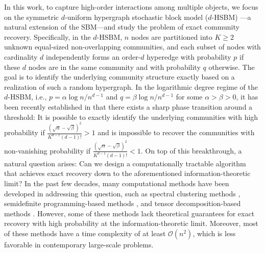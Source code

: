 \documentclass{article}
\theoremstyle{plain}
\theoremstyle{definition}
\theoremstyle{remark}
\newcommand{\OCal}{\mathcal{O}}
\begin{document}
In this work, to capture high-order interactions among multiple objects, we focus on the symmetric $d$-uniform hypergraph stochastic block model ($d$-HSBM) \citep{ghoshdastidar2014consistency, ghoshdastidar2017consistency, kim2018stochastic, chien2018community, ahn2018hypergraph, ke2019community, cole2020exact, zhang2022exact}---a natural extension of the SBM---and study the problem of exact community recovery. Specifically, in the $d$-HSBM, $n$ nodes are partitioned into $K \geq 2$ unknown equal-sized non-overlapping communities, and each subset of nodes with cardinality $d$ independently forms an order-$d$ hyperedge with probability $p$ if these $d$ nodes are in the same community and with probability $q$ otherwise. The goal is to identify the underlying community structure exactly based on a realization of such a random hypergraph. In the logarithmic degree regime of the $d$-HSBM, i.e., $p=\alpha \log n/n^{d-1}$ and $q =\beta \log n/{n^{d-1}}$ for some $\alpha>\beta >0$, it has been recently established in \citet{kim2017community,kim2018stochastic,zhang2022exact} that there exists a sharp phase transition around a threshold: It is possible to exactly identify the underlying communities with high probability if $\frac{(\sqrt{\alpha} - \sqrt{\beta})^2}{K^{d-1}(d-1)!} >1$ and is impossible to recover the communities with non-vanishing probability if $\frac{(\sqrt{\alpha} - \sqrt{\beta})^2}{K^{d-1}(d-1)!} <1$. On top of this breakthrough, a natural question arises: Can we design a computationally tractable algorithm that achieves exact recovery down to the aforementioned information-theoretic limit? In the past few decades, many computational methods have been developed in addressing this question, such as spectral clustering methods \citep{ghoshdastidar2015provable,ghoshdastidar2017consistency, chien2018community, ahn2018hypergraph,zhang2022exact}, semidefinite programming-based methods \citep{kim2018stochastic,gaudio2022community}, and tensor decomposition-based methods \citep{ke2019community,han2022exact}. However, some of these methods lack theoretical guarantees for exact recovery with high probability at the information-theoretic limit. Moreover, most of these methods have a time complexity of at least $\OCal(n^2)$, which is less favorable in contemporary large-scale problems.
\end{document}

